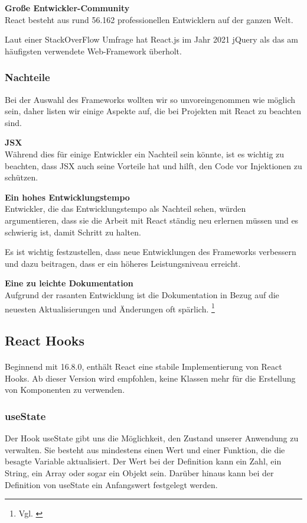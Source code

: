 \textbf{Große Entwickler-Community}\\
React besteht aus rund 56.162 professionellen Entwicklern auf der ganzen Welt.

Laut einer StackOverFlow Umfrage hat React.js im Jahr 2021 jQuery als das am häufigsten verwendete Web-Framework überholt. {\cite{SO01}}
\newpage

\subsubsection{Nachteile}
Bei der Auswahl des Frameworks wollten wir so unvoreingenommen wie möglich sein, daher listen wir einige Aspekte auf, die bei Projekten mit React zu beachten sind.
\newline

\textbf{JSX}\\
Während dies für einige Entwickler ein Nachteil sein könnte, ist es wichtig zu beachten, dass JSX auch seine Vorteile hat und hilft, den Code vor Injektionen zu schützen.
\newline

\textbf{Ein hohes Entwicklungstempo}\\
Entwickler, die das Entwicklungstempo als Nachteil sehen, würden argumentieren, dass sie die Arbeit mit React ständig neu erlernen müssen und es schwierig ist, damit Schritt zu halten.

Es ist wichtig festzustellen, dass neue Entwicklungen des Frameworks verbessern und dazu beitragen, dass er ein höheres Leistungsniveau erreicht.
\newline

\textbf{Eine zu leichte Dokumentation}\\
Aufgrund der rasanten Entwicklung ist die Dokumentation in Bezug auf die neuesten Aktualisierungen und Änderungen oft spärlich.
\footnote{ Vgl. \cite{R01}}

\subsection{React Hooks}
\paragraph{}
Beginnend mit 16.8.0, enthält React eine stabile Implementierung von React Hooks. Ab dieser Version wird empfohlen, keine Klassen mehr für die Erstellung von Komponenten zu verwenden.

\subsubsection{useState}
Der Hook useState gibt uns die Möglichkeit, den Zustand unserer Anwendung zu verwalten. Sie besteht aus mindestens einen Wert und einer Funktion, die die besagte Variable aktualisiert.
Der Wert bei der Definition kann ein Zahl, ein String, ein Array oder sogar ein Objekt sein.
Darüber hinaus kann bei der Definition von useState ein Anfangswert festgelegt werden.

